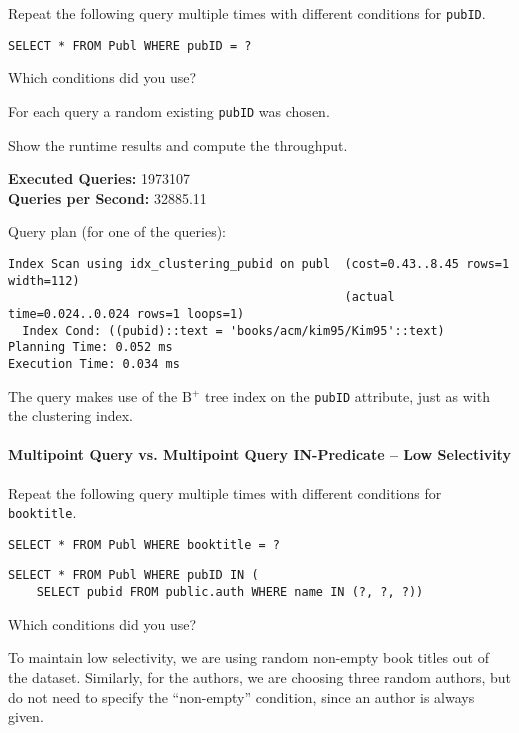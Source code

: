 \documentclass[11pt]{scrartcl}
\begin{document}
Repeat the following query multiple times with different conditions for \texttt{pubID}.

\begin{lstlisting}[style=dbtsql]
SELECT * FROM Publ WHERE pubID = ?
\end{lstlisting}

Which conditions did you use?

For each query a random existing \texttt{pubID} was chosen.

Show the runtime results and compute the throughput.

\textbf{Executed Queries: } 1973107\\
\textbf{Queries per Second: } 32885.11

Query plan (for one of the queries):

{\small
\parskip0pt\begin{verbatim}
Index Scan using idx_clustering_pubid on publ  (cost=0.43..8.45 rows=1 width=112)
                                               (actual time=0.024..0.024 rows=1 loops=1)
  Index Cond: ((pubid)::text = 'books/acm/kim95/Kim95'::text)
Planning Time: 0.052 ms
Execution Time: 0.034 ms
\end{verbatim}}
The query makes use of the B$^+$ tree index on the \texttt{pubID} attribute, just as with the clustering index.

\paragraph{Multipoint Query vs. Multipoint Query IN-Predicate -- Low Selectivity}

Repeat the following query multiple times with different conditions for \texttt{booktitle}.

\begin{lstlisting}[style=dbtsql]
SELECT * FROM Publ WHERE booktitle = ?
\end{lstlisting}

\begin{lstlisting}[style=dbtsql]
SELECT * FROM Publ WHERE pubID IN (
    SELECT pubid FROM public.auth WHERE name IN (?, ?, ?))
\end{lstlisting}


Which conditions did you use?

To maintain low selectivity, we are using random non-empty book titles out of the dataset.
Similarly, for the authors, we are choosing three random authors, but do not need to specify the \enquote{non-empty}
condition, since an author is always given.
\end{document}
